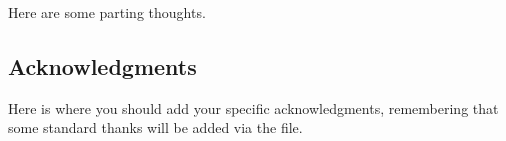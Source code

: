 \documentclass[\docopts]{\docclass}
\begin{document}
Here are some parting thoughts.



\subsection*{Acknowledgments}

Here is where you should add your specific acknowledgments, remembering that some standard thanks will be added via the  file.





\end{document}
